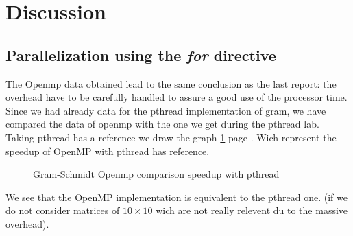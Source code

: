 \section{Discussion}

\subsection{Parallelization using the \textit{for} directive}

The Openmp data obtained lead to the same conclusion as the last report: the overhead have to be carefully handled to assure a good use of the processor time.\\

Since we had already data for the pthread implementation of gram, we have compared the data of openmp with the one we get during the pthread lab. Taking pthread has a reference we draw the graph \ref{fig:gram_pthread} page \pageref{fig:gram_pthread}. Wich represent the speedup of OpenMP with pthread has reference.

\begin{figure}[ht]
  \begin{center}
  \end{center}
  \caption{Gram-Schmidt Openmp comparison speedup with pthread}
  \label{fig:gram_pthread}
\end{figure} 

We see that the OpenMP implementation is equivalent to the pthread one.
(if we do not consider matrices of $10\times 10$ wich are not really relevent du to the massive overhead).
